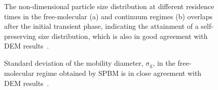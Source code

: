 \begin{figure}[H]
\begin{subfigure}[t]{0.4\textwidth}
	\end{subfigure}
	\caption{The non-dimensional particle size distribution at different residence times in the free-molecular (a) and continuum regimes (b) overlaps after the initial transient phase, indicating the attainment of a self-preserving size distribution, which is also in good agreement with DEM results~\citep{goudeli2015coagulation}.}
	\label{fig:coagvalid_psd} 
\end{figure}


\begin{figure}[H]
	\centering
	\begin{subfigure}[t]{0.4\textwidth}
	\end{subfigure}
	\caption{Standard deviation of the mobility diameter, $\mathrm{\sigma_g}$, in the free-molecular regime obtained by SPBM is in close agreement with DEM results~\citep{kholghy2021surface}.}
	\label{fig:coagvalid_sigma} 
\end{figure}



